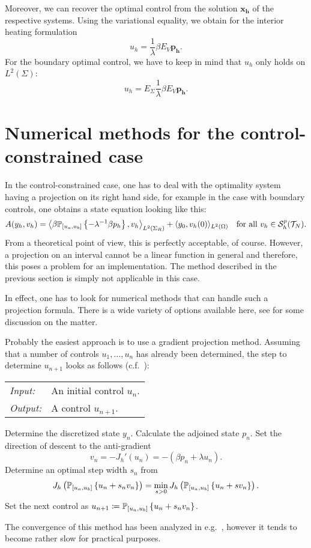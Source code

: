\documentclass[../thesis.tex]{subfiles}
\begin{document}
Moreover, we can recover the optimal control from the solution $\boldsymbol{x_h}$ of the respective systems.
Using the variational equality, we obtain for the interior heating formulation
\[
	u_h = \frac{1}{\lambda} \beta E_V \boldsymbol{p_h}.
\]
For the boundary optimal control, we have to keep in mind that $u_h$ only holds on $L^2(\Sigma)$:
\[
	u_h = E_\Sigma \frac{1}{\lambda} \beta E_V \boldsymbol{p_h}.
\]
\section{Numerical methods for the control-constrained case}
In the control-constrained case, one has to deal with the optimality system having a projection on its right hand side, for example in the case with boundary controls, one obtains a state equation looking like this:
\[
A(y_h, v_h) = \left\langle \beta \mathbb{P}_{[u_a, u_b]} \left\{ - \lambda^{-1} \beta p_h \right\}, v_h \right\rangle_{L^2(\Sigma_R)} + \langle y_0, v_h(0) \rangle_{L^2(\Omega)} \quad \text{for all $v_h \in \mathcal{S}_h^p(\mathcal{T}_N)$}.
\]
From a theoretical point of view, this is perfectly acceptable, of course.
However, a projection on an interval cannot be a linear function in general and therefore, this poses a problem for an implementation.
The method described in the previous section is simply not applicable in this case.

In effect, one has to look for numerical methods that can handle such a projection formula.
There is a wide variety of options available here, see \cite[p.\ 134ff.]{Troeltzsch} for some discussion on the matter.

Probably the easiest approach is to use a gradient projection method.
Assuming that a number of controls $u_1, \ldots, u_n$ has already been determined, the step to determine $u_{n+1}$ looks as follows (c.f.\ \cite{Troeltzsch}):
\begin{algorithmbox}
\begin{tabular}{@{}ll}
\textit{Input:} & An initial control $u_n$. \\
\textit{Output:} & A control $u_{n+1}$.
\end{tabular}
\end{algorithmbox}
\vspace{-10pt}
\begin{algorithm}
Determine the discretized state $y_n$.\;
Calculate the adjoined state $p_n$.\;
Set the direction of descent to the anti-gradient
\[
	v_n = -J_h'(u_n) = - (\beta p_n + \lambda u_n).
\]\;
\vspace{-15pt}
Determine an optimal step width $s_n$ from
\[
	J_h \left( \mathbb{P}_{[u_a, u_b]} \left\{ u_n + s_n v_n \right\} \right) = \min_{s > 0} J_h \left( \mathbb{P}_{[u_a, u_b]} \left\{ u_n + s v_n \right\} \right).
\]\;
\vspace{-15pt}
Set the next control as $u_{n+1} \coloneqq \mathbb{P}_{[u_a, u_b]} \left\{ u_n + s_n v_n \right\}$.
\end{algorithm}
\vspace{-4pt}
\EndAlgorithmLine
The convergence of this method has been analyzed in e.g.\ \cite{HinzePinnauUlbrich}, however it tends to become rather slow for practical purposes.
\end{document}
